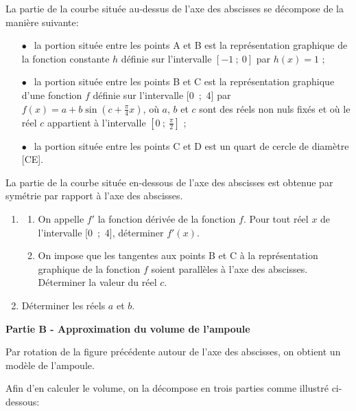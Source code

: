 \documentclass[10pt,a4paper]{article}
\begin{document}
La partie de la courbe située au-dessus de l'axe des abscisses se décompose de la manière suivante:

\setlength\parindent{9mm}
\begin{itemize}
\item[$\bullet~~$] la portion située entre les points A et B est la représentation graphique de la fonction constante
$h$ définie sur l'intervalle $[-1~;~0]$ par $h(x) = 1$ ;
\item[$\bullet~~$] la portion située entre les points B et C est la représentation graphique d'une fonction $f$ définie sur l'intervalle [0~;~4] par $f(x) = a + b \sin \left(c + \frac{\pi}{4} x\right)$, où $a$, $b$ et $c$ sont des réels non nuls
fixés et où le réel $c$ appartient à l'intervalle $\left[0~;~\frac{\pi}{2}\right]$ ;
\item[$\bullet~~$] la portion située entre les points C et D est un quart de cercle de diamètre [CE].
\end{itemize}
\setlength\parindent{0mm}

La partie de la courbe située en-dessous de l'axe des abscisses est obtenue par symétrie par rapport à l'axe des abscisses.

\medskip

\begin{enumerate}
\item 
	\begin{enumerate}
		\item On appelle $f'$ la fonction dérivée de la fonction $f$. Pour tout réel $x$ de l'intervalle [0~;~4], déterminer $f'(x)$.
		\item On impose que les tangentes aux points B et C à la représentation graphique de la fonction $f$ soient parallèles à l'axe des abscisses. Déterminer la valeur du réel $c$.
	\end{enumerate}
\item  Déterminer les réels $a$ et $b$.
\end{enumerate}

\bigskip

\textbf{Partie B - Approximation du volume de l'ampoule}

\medskip

Par rotation de la figure précédente autour de l'axe des abscisses, on obtient un modèle de l'ampoule.

Afin d'en calculer le volume, on la décompose en trois parties comme illustré ci-dessous:
\end{document}
